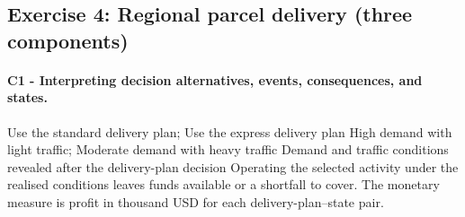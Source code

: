 	\newpage
	\subsection{Exercise 4: Regional parcel delivery (three components)}
	\label{sec:problem4-regional-delivery-c1-c3}
	\paragraph*{C1 - Interpreting decision alternatives, events, consequences, and states.}
	\DecisionElementsTable
{Use the standard delivery plan; Use the express delivery plan}
{High demand with light traffic; Moderate demand with heavy traffic}
{Demand and traffic conditions revealed after the delivery-plan decision}
{Operating the selected activity under the realised conditions leaves funds available or a shortfall to cover. The monetary measure is profit in thousand USD for each delivery-plan--state pair.}



